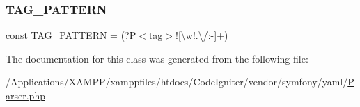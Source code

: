 \subsubsection{\texorpdfstring{T\+A\+G\+\_\+\+P\+A\+T\+T\+E\+RN}{TAG\_PATTERN}}
{\footnotesize\ttfamily const T\+A\+G\+\_\+\+P\+A\+T\+T\+E\+RN = \textquotesingle{}(?P$<$tag$>$!\mbox{[}\textbackslash{}w!.\textbackslash{}/\+:-\/\mbox{]}+)\textquotesingle{}}



The documentation for this class was generated from the following file\+:\begin{DoxyCompactItemize}
\item 
/\+Applications/\+X\+A\+M\+P\+P/xamppfiles/htdocs/\+Code\+Igniter/vendor/symfony/yaml/\mbox{\hyperlink{vendor_2symfony_2yaml_2_parser_8php}{Parser.\+php}}\end{DoxyCompactItemize}

